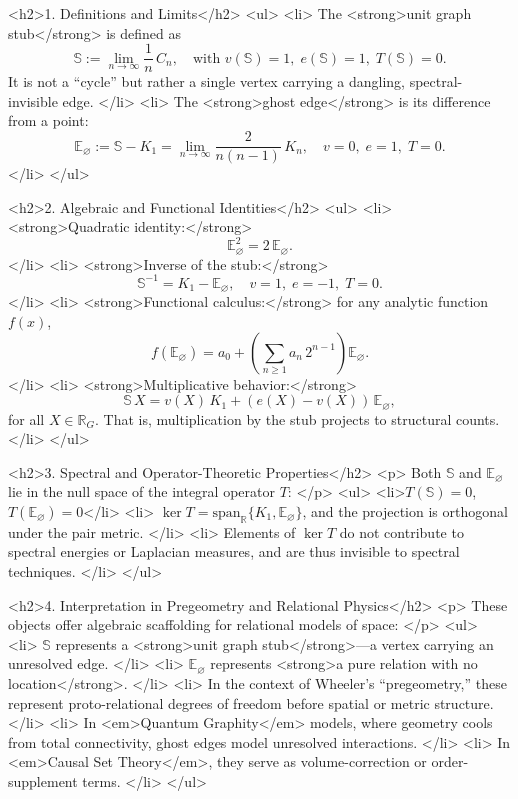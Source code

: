   <h2>1. Definitions and Limits</h2>
  <ul>
    <li>
      The <strong>unit graph stub</strong> is defined as  
      \[
        \mathbb S := \lim_{n\to\infty} \frac{1}{n}\,C_n,
        \quad \text{with } v(\mathbb S) = 1,\; e(\mathbb S) = 1,\; T(\mathbb S) = 0.
      \]
      It is not a “cycle” but rather a single vertex carrying a dangling, spectral-invisible edge.
    </li>
    <li>
      The <strong>ghost edge</strong> is its difference from a point:
      \[
        \mathbb E_\varnothing := \mathbb S - K_1 = \lim_{n\to\infty} \frac{2}{n(n-1)}\,K_n,
        \quad v = 0,\; e = 1,\; T = 0.
      \]
    </li>
  </ul>

  <h2>2. Algebraic and Functional Identities</h2>
  <ul>
    <li>
      <strong>Quadratic identity:</strong>
      \[
        \mathbb E_\varnothing^2 = 2\,\mathbb E_\varnothing.
      \]
    </li>
    <li>
      <strong>Inverse of the stub:</strong>
      \[
        \mathbb S^{-1} = K_1 - \mathbb E_\varnothing,
        \quad v = 1,\; e = -1,\; T = 0.
      \]
    </li>
    <li>
      <strong>Functional calculus:</strong>
      for any analytic function \(f(x)\),
      \[
        f(\mathbb E_\varnothing) = a_0 + \left(\sum_{n\ge1} a_n\,2^{n-1}\right) \mathbb E_\varnothing.
      \]
    </li>
    <li>
      <strong>Multiplicative behavior:</strong>
      \[
        \mathbb S\,X = v(X)\,K_1 + (e(X)-v(X))\,\mathbb E_\varnothing,
      \]
      for all \(X\in\mathbb R_G\). That is, multiplication by the stub projects to structural counts.
    </li>
  </ul>

  <h2>3. Spectral and Operator-Theoretic Properties</h2>
  <p>
    Both \(\mathbb S\) and \(\mathbb E_\varnothing\) lie in the null space of the integral operator \(T\):
  </p>
  <ul>
    <li>\(T(\mathbb S) = 0\), \(T(\mathbb E_\varnothing) = 0\)</li>
    <li>
      \(\ker T = \mathrm{span}_\mathbb R\{K_1, \mathbb E_\varnothing\}\), and the projection is orthogonal under the pair metric.
    </li>
    <li>
      Elements of \(\ker T\) do not contribute to spectral energies or Laplacian measures, and are thus invisible to spectral techniques.
    </li>
  </ul>

  <h2>4. Interpretation in Pregeometry and Relational Physics</h2>
  <p>
    These objects offer algebraic scaffolding for relational models of space:
  </p>
  <ul>
    <li>
      \(\mathbb S\) represents a <strong>unit graph stub</strong>—a vertex carrying an unresolved edge.
    </li>
    <li>
      \(\mathbb E_\varnothing\) represents <strong>a pure relation with no location</strong>.
    </li>
    <li>
      In the context of Wheeler’s “pregeometry,” these represent proto-relational degrees of freedom before spatial or metric structure.
    </li>
    <li>
      In <em>Quantum Graphity</em> models, where geometry cools from total connectivity, ghost edges model unresolved interactions.
    </li>
    <li>
      In <em>Causal Set Theory</em>, they serve as volume-correction or order-supplement terms.
    </li>
  </ul>

